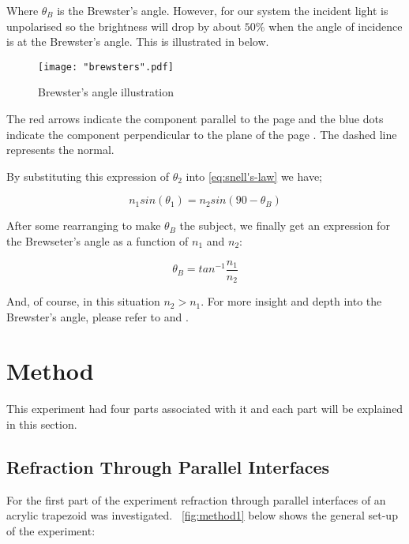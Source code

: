 \documentclass{article}
\newcommand{\figref}[2][\figurename~]{#1\ref{#2}}
\begin{document}
\noindent
Where $\theta_B$ is the Brewster's angle. However, for our system the incident light is unpolarised so the brightness will drop by about $50\%$ when the angle of incidence is at the Brewster's angle. This is illustrated in  below. 

\begin{figure}[h]
\centering
\texttt{[image: "brewsters".pdf]}
\caption{Brewster's angle illustration}
\label{fig:critical-angle}
\end{figure}

\noindent
The red arrows indicate the component parallel to the page and the blue dots indicate the component perpendicular to the plane of the page \cite{Book02}. The dashed line represents the normal.

\vspace{2mm}
\noindent
By substituting this expression of $\theta_2$ into \eqref{eq:snell's-law} we have;

\begin{equation}
\label{eq:brewster's-angle3}
n_1sin(\theta_1) = n_2sin(90-\theta_B) 
\end{equation}

\noindent 
After some rearranging to make $\theta_B$ the subject, we finally get an expression for the Brewseter's angle as a function of $n_1$ and $n_2$:


\begin{equation}
\label{eq:brewser's-angle}
\theta_B = tan^{-1}\frac{n_1}{n_2}
\end{equation}

\noindent
And, of course, in this situation $n_2>n_1$. For more insight and depth into the Brewster's angle, please refer to \cite{Paper01} and \cite{Book02}.



\section{Method}
\label{sec:method}

This experiment had four parts associated with it and each part will be explained in this section.

\subsection{Refraction Through Parallel Interfaces}
\label{ssec:parallel-interfaces}

For the first part of the experiment refraction through parallel interfaces of an acrylic trapezoid was investigated. \figref{fig:method1} below shows the general set-up of the experiment:
\end{document}
